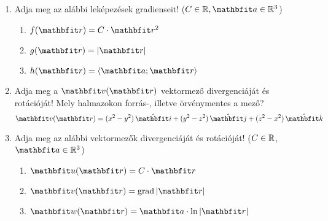 \documentclass{szb-practice}
\begin{document}
\begin{enumerate}
  \item Adja meg az alábbi leképezések gradienseit!
        ($C \in \Reals, \rvec a \in \Reals^3$)
        \begin{enumerate}
          \item $f (\coordvec) = C \cdot \coordvec^2$
          \item $g (\coordvec) = |\coordvec|$
          \item $h (\coordvec) = \scalar{\rvec a}{\coordvec}$
        \end{enumerate}

  \item Adja meg a $\rvec v (\coordvec)$ vektormező divergenciáját és rotációját!
        Mely halmazokon forrás-, illetve örvénymentes a mező?
        $$
          \rvec v(\coordvec) = \ijk{x^2 - y^2}{y^2 - z^2}{z^2 - x^2}
        $$

  \item Adja meg az alábbi vektormezők divergenciáját és rotációját!
        ($C \in \mathbb{R}$, $\rvec a \in \Reals^3$)
        \begin{enumerate}
          \item $\rvec u(\coordvec) = C \cdot \coordvec$
          \item $\rvec v(\coordvec) = \grad |\coordvec|$
          \item $\rvec w(\coordvec) = \rvec a \cdot \ln |\coordvec|$
        \end{enumerate}
\end{enumerate}
\end{document}
